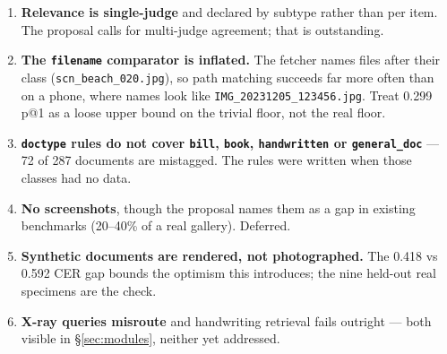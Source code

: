 \documentclass[11pt,a4paper]{article}
\newcommand{\code}[1]{\texttt{\small #1}}
\begin{document}
\begin{enumerate}[leftmargin=1.5em,itemsep=0.35em]
  \item \textbf{Relevance is single-judge} and declared by subtype rather than
        per item. The proposal calls for multi-judge agreement; that is
        outstanding.
  \item \textbf{The \code{filename} comparator is inflated.} The fetcher names
        files after their class (\code{scn\_beach\_020.jpg}), so path matching
        succeeds far more often than on a phone, where names look like
        \code{IMG\_20231205\_123456.jpg}. Treat 0.299 p@1 as a loose upper bound
        on the trivial floor, not the real floor.
  \item \textbf{\code{doctype} rules do not cover \code{bill}, \code{book},
        \code{handwritten} or \code{general\_doc}} --- 72 of 287 documents are
        mistagged. The rules were written when those classes had no data.
  \item \textbf{No screenshots}, though the proposal names them as a gap in
        existing benchmarks (20--40\% of a real gallery). Deferred.
  \item \textbf{Synthetic documents are rendered, not photographed.} The
        0.418 vs 0.592 CER gap bounds the optimism this introduces; the nine
        held-out real specimens are the check.
  \item \textbf{X-ray queries misroute} and handwriting retrieval fails
        outright --- both visible in \S\ref{sec:modules}, neither yet addressed.
\end{enumerate}
\end{document}
